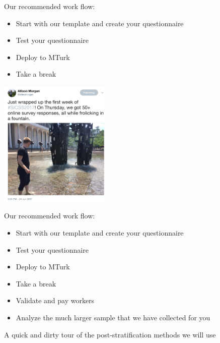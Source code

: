\documentclass[aspectratio=169]{beamer}
\begin{document}
\begin{frame}

Our recommended work flow:
\begin{itemize}
\item Start with our template and create your questionnaire
\item Test your questionnaire
\item Deploy to MTurk
\item Take a break
\end{itemize}

\end{frame}
\begin{frame}

\begin{center}
\includegraphics[width=0.4\textwidth]{figures/morgan_tweet}
\end{center}

\end{frame}
\begin{frame}

Our recommended work flow:
\begin{itemize}
\item Start with our template and create your questionnaire
\item Test your questionnaire
\item Deploy to MTurk
\item Take a break
\item Validate and pay workers
\pause
\item Analyze the much larger sample that we have collected for you
\end{itemize}

\end{frame}
\begin{frame}

A quick and dirty tour of the post-stratification methods we will use

\end{frame}
\end{document}

